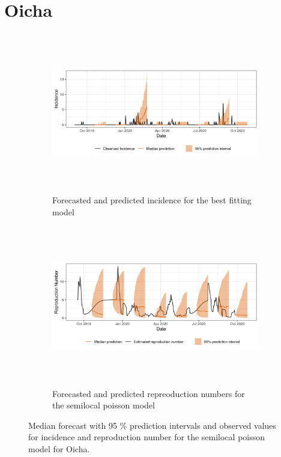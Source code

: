  \section{ Oicha }\begin{figure}[H]\begin{subfigure}{\textwidth}  \centering  \includegraphics[width=0.9\linewidth, height=7cm]{../output/Oicha_predictions.png}  \caption{Forecasted and predicted incidence for the best fitting model}\end{subfigure}

\begin{subfigure}{\textwidth}  \centering  \includegraphics[width=0.9\linewidth, height=7cm]{../output/Oicha_Rs.png}  \caption{Forecasted and predicted repreoduction numbers for the semilocal poisson model}\end{subfigure}  \caption{Median forecast with 95 \% prediction intervals and observed values for incidence and reproduction number for the semilocal poisson model for Oicha.}\end{figure}

